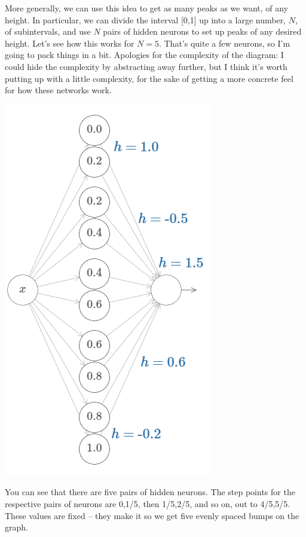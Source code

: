 \documentclass[a4paper,twoside,10pt]{book}
\begin{document}
More generally, we can use this idea to get as many peaks as we want, of any height. In particular, we can divide the interval [0,1] up into a large number, $N$, of subintervals, and use $N$ pairs of hidden neurons to set up peaks of any desired height. Let's see how this works for $N=5$. That's quite a few neurons, so I'm going to pack things in a bit. Apologies for the complexity of the diagram: I could hide the complexity by abstracting away further, but I think it's worth putting up with a little complexity, for the sake of getting a more concrete feel for how these networks work.
\begin{center}
\includegraphics[height=0.65\linewidth]{./figures/ch4/tikz438}
\end{center}
You can see that there are five pairs of hidden neurons. The step points for the respective pairs of neurons are 0,1/5, then 1/5,2/5, and so on, out to 4/5,5/5. These values are fixed -- they make it so we get five evenly spaced bumps on the graph.
\end{document}
